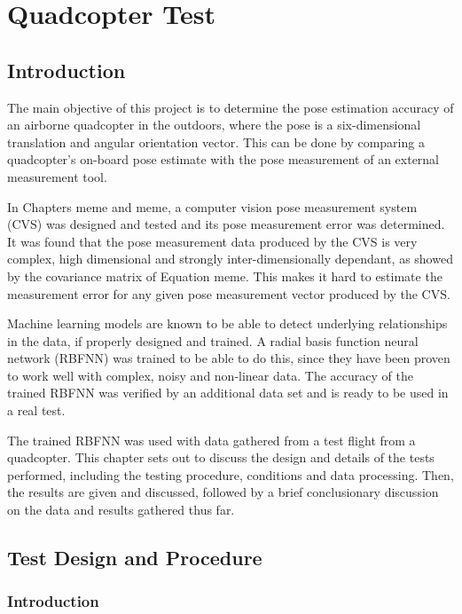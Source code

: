 \chapter{Quadcopter Test}

\section{Introduction}

The main objective of this project is to determine the pose estimation accuracy of an airborne quadcopter in the outdoors, where the pose is a six-dimensional translation and angular orientation vector. This can be done by comparing a quadcopter's on-board pose estimate with the pose measurement of an external measurement tool. 

In Chapters meme and meme, a computer vision pose measurement system (CVS) was designed and tested and its pose measurement error was determined. It was found that the pose measurement data produced by the CVS is very complex, high dimensional and strongly inter-dimensionally dependant, as showed by the covariance matrix of Equation meme. This makes it hard to estimate the measurement error for any given pose measurement vector produced by the CVS.\@ 

Machine learning models are known to be able to detect underlying relationships in the data, if properly designed and trained. A radial basis function neural network (RBFNN) was trained to be able to do this, since they have been proven to work well with complex, noisy and non-linear data. The accuracy of the trained RBFNN was verified by an additional data set and is ready to be used in a real test. 

The trained RBFNN was used with data gathered from a test flight from a quadcopter. This chapter sets out to discuss the design and details of the tests performed, including the testing procedure, conditions and data processing. Then, the results are given and discussed, followed by a brief conclusionary discussion on the data and results gathered thus far. 

\section{Test Design and Procedure}

\subsection{Introduction}

